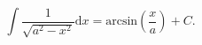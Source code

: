 $$ 
  \int \frac{1}{\sqrt{a^2 - x^2}} \mathrm{d}x
  = \mathrm{arcsin} \left ( \frac{x}{a} \right ) + C .
  $$